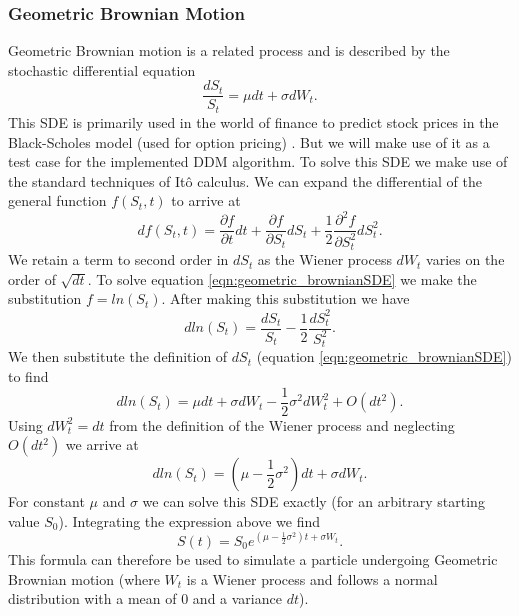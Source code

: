 \documentclass[10pt]{article}
\begin{document}
\subsubsection{Geometric Brownian Motion}
Geometric Brownian motion is a related process and is described by the stochastic differential equation 
\begin{equation}
\label{eqn:geometric_brownianSDE}
\frac{dS_t}{S_t} = \mu dt + \sigma dW_t.
\end{equation}
This SDE is primarily used in the world of finance to predict stock prices in the Black-Scholes model (used for option pricing) \cite{sde}. But we will make use of it as a test case for the implemented DDM algorithm. To solve this SDE we make use of the standard techniques of Itô calculus. We can expand the differential of the general function $f(S_t, t)$ to arrive at
\begin{equation}
df(S_t, t) = \frac{\partial f}{\partial t} dt + \frac{\partial f}{\partial S_t} dS_t + \frac{1}{2} \frac{\partial^2 f}{\partial S_t^2} dS_t^2.
\end{equation}
We retain a term to second order in $dS_t$ as the Wiener process $dW_t$ varies on the order of $\sqrt{dt}$. To solve equation \ref{eqn:geometric_brownianSDE} we make the substitution $f = ln(S_t)$. After making this substitution we have
\begin{equation}
dln(S_t) = \frac{dS_t }{S_t} - \frac{1}{2}\frac{dS_t^2}{S_t^2}.
\end{equation}
We then substitute the definition of $dS_t$ (equation \ref{eqn:geometric_brownianSDE}) to find
\begin{equation}
dln(S_t) = \mu dt + \sigma dW_t - \frac{1}{2} \sigma^2 dW_t^2 + O(dt^2).
\end{equation}
Using $dW_t^2 = dt$ from the definition of the Wiener process and neglecting $O(dt^2)$ we arrive at
\begin{equation}
dln(S_t) = (\mu - \frac{1}{2} \sigma^2) dt + \sigma dW_t.
\end{equation}
For constant $\mu$ and $\sigma$ we can solve this SDE exactly (for an arbitrary starting value $S_0$). Integrating the expression above we find
\begin{equation}
\label{eqn:geometric_brownian_equation}
S(t) = S_0 e^{(\mu - \frac{1}{2} \sigma^2) t + \sigma W_t}.
\end{equation}
This formula can therefore be used to simulate a particle undergoing Geometric Brownian motion (where $W_t$ is a Wiener process and follows a normal distribution with a mean of 0 and a variance $dt$).
\end{document}
